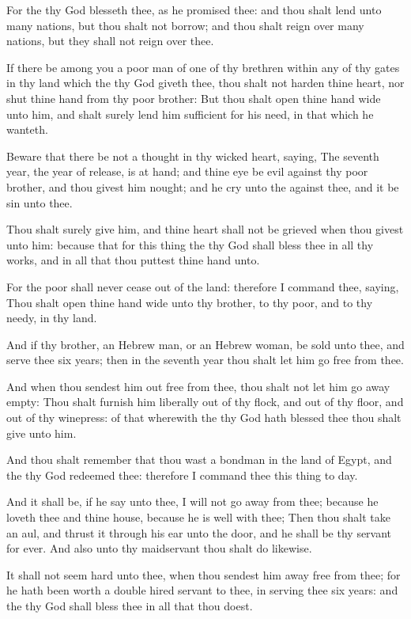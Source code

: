 \verse For the \LORD thy God blesseth thee, as he promised thee: and thou shalt lend unto many nations, but thou shalt not borrow; and thou shalt reign over many nations, but they shall not reign over thee.

\verse If there be among you a poor man of one of thy brethren within any of thy gates in thy land which the \LORD thy God giveth thee, thou shalt not harden thine heart, nor shut thine hand from thy poor brother: \verse But thou shalt open thine hand wide unto him, and shalt surely lend him sufficient for his need, in that which he wanteth.

\verse Beware that there be not a thought in thy wicked heart, saying, The seventh year, the year of release, is at hand; and thine eye be evil against thy poor brother, and thou givest him nought; and he cry unto the \LORD against thee, and it be sin unto thee.

\verse Thou shalt surely give him, and thine heart shall not be grieved when thou givest unto him: because that for this thing the \LORD thy God shall bless thee in all thy works, and in all that thou puttest thine hand unto.

\verse For the poor shall never cease out of the land: therefore I command thee, saying, Thou shalt open thine hand wide unto thy brother, to thy poor, and to thy needy, in thy land.

\verse And if thy brother, an Hebrew man, or an Hebrew woman, be sold unto thee, and serve thee six years; then in the seventh year thou shalt let him go free from thee.

\verse And when thou sendest him out free from thee, thou shalt not let him go away empty: \verse Thou shalt furnish him liberally out of thy flock, and out of thy floor, and out of thy winepress: of that wherewith the \LORD thy God hath blessed thee thou shalt give unto him.

\verse And thou shalt remember that thou wast a bondman in the land of Egypt, and the \LORD thy God redeemed thee: therefore I command thee this thing to day.

\verse And it shall be, if he say unto thee, I will not go away from thee; because he loveth thee and thine house, because he is well with thee; \verse Then thou shalt take an aul, and thrust it through his ear unto the door, and he shall be thy servant for ever. And also unto thy maidservant thou shalt do likewise.

\verse It shall not seem hard unto thee, when thou sendest him away free from thee; for he hath been worth a double hired servant to thee, in serving thee six years: and the \LORD thy God shall bless thee in all that thou doest.

